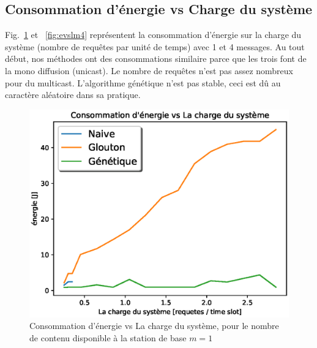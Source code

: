 \documentclass[runningheads]{llncs}
\begin{document}
\subsection{Consommation d'\'energie vs Charge du syst\`eme}
Fig.~\ref{fig:evslm1} et ~\ref{fig:evslm4}  repr\'esentent la consommation d'énergie sur 
la charge du système (nombre de requêtes par unit\'e de temps) avec 1 et 4 messages.
Au tout début, nos méthodes ont des consommations similaire parce que les
trois font de la mono diffusion (unicast). Le nombre de requêtes n'est pas 
assez nombreux pour du multicast.
L'algorithme g\'en\'etique n'est pas stable, ceci est dû au caract\`ere 
aléatoire dans sa pratique.
\begin{figure}[H]
    
    \includegraphics[width=\textwidth]{EvsL1.eps}
    \caption{Consommation d'énergie vs La charge du système, pour 
    le nombre de contenu disponible \`a la station de base $m=1$} 
    \label{fig:evslm1}
\end{figure}
\end{document}
